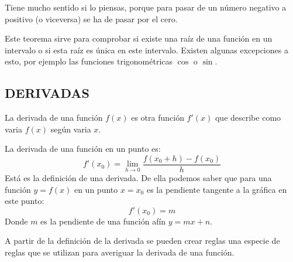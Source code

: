 \documentclass[arial,a4paper,print]{article}
\begin{document}
Tiene mucho sentido si lo piensas, porque para pasar de un número negativo a positivo (o viceversa) se ha de pasar por el cero.

Este teorema sirve para comprobar si existe una raíz de una función en un intervalo o si esta raíz es única en este intervalo. Existen algunas excepciones a esto, por ejemplo las funciones trigonométricas $\cos$ o $\sin$. 

\subsection{DERIVADAS}
La derivada de una función $f(x)$ es otra función $f'(x)$ que describe como varia $f(x)$ según varia $x$. 

La derivada de una función en un punto es:
\begin{equation*}
	f'(x_{0}) = \lim_{h\rightarrow 0} \frac{f(x_{0} + h) - f(x_{0})}{h}
\end{equation*}
Está es la definición de una derivada. De ella podemos saber que para una función $y = f(x)$ en un punto $x = x_{0}$ es la pendiente tangente a la gráfica en este punto:
\begin{equation*}
	f'(x_{0}) = m
\end{equation*}
Donde $m$ es la pendiente de una función afín $ y = mx + n$. 
 
A partir de la definición de la derivada se pueden crear reglas una especie de reglas que se utilizan para averiguar la derivada de una función. 
\end{document}
